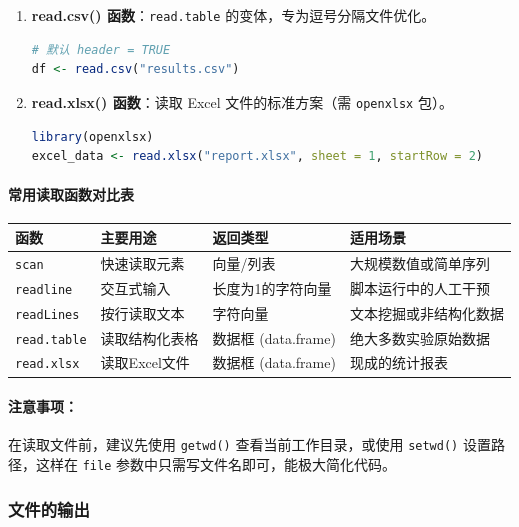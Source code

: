\begin{enumerate}[label=\arabic*., leftmargin=2em]
    \item \textbf{read.csv() 函数}：\texttt{read.table} 的变体，专为逗号分隔文件优化。
\begin{lstlisting}[language=R]
# 默认 header = TRUE
df <- read.csv("results.csv")
\end{lstlisting}

    \item \textbf{read.xlsx() 函数}：读取 Excel 文件的标准方案（需 \texttt{openxlsx} 包）。
\begin{lstlisting}[language=R]
library(openxlsx)
excel_data <- read.xlsx("report.xlsx", sheet = 1, startRow = 2)
\end{lstlisting}
\end{enumerate}

\paragraph{常用读取函数对比表}
\begin{table}[h]
\centering
\renewcommand{\arraystretch}{1.5}
\begin{tabular}{|l|l|l|l|}
\hline
\textbf{函数} & \textbf{主要用途} & \textbf{返回类型} & \textbf{适用场景} \\ \hline
\texttt{scan} & 快速读取元素 & 向量/列表 & 大规模数值或简单序列 \\ \hline
\texttt{readline} & 交互式输入 & 长度为1的字符向量 & 脚本运行中的人工干预 \\ \hline
\texttt{readLines} & 按行读取文本 & 字符向量 & 文本挖掘或非结构化数据 \\ \hline
\texttt{read.table} & 读取结构化表格 & 数据框 (data.frame) & 绝大多数实验原始数据 \\ \hline
\texttt{read.xlsx} & 读取Excel文件 & 数据框 (data.frame) & 现成的统计报表 \\ \hline
\end{tabular}
\end{table}

\paragraph{注意事项：}
在读取文件前，建议先使用 \texttt{getwd()} 查看当前工作目录，或使用 \texttt{setwd()} 设置路径，这样在 \texttt{file} 参数中只需写文件名即可，能极大简化代码。

\subsubsection{文件的输出}

